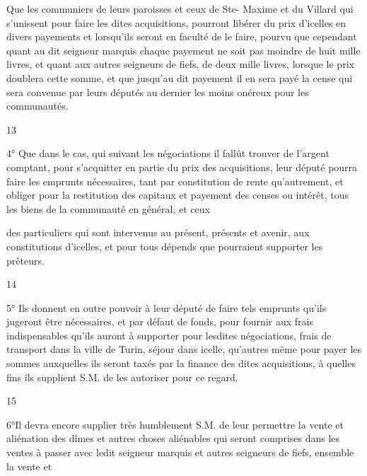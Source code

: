 \documentclass[a4paper,twoside,openany]{article}
\begin{document}

Que les communiers de leurs paroisses et ceux de Ste-
Maxime et du Villard qui s’unissent pour faire les
dites acquisitions, pourront libérer du prix d’icelles
en divers payements et lorsqu’ils seront en faculté de
le faire, pourvu que cependant quant au dit seigneur
marquis chaque payement ne soit pas moindre de
huit mille livres, et quant aux autres seigneurs de fiefs,
de deux mille livres, lorsque le prix doublera cette
somme, et que jusqu’au dit payement il en sera
payé la cense qui sera convenue par leurs députés au
dernier les moins onéreux pour les communautés.

\begin{center}
13
\end{center}
4° Que dans le cas, qui suivant les négociations il
fallût trouver de l’argent comptant, pour s’acquitter
en partie du prix des acquisitions, leur député pourra
faire les emprunts nécessaires, tant par constitution de
rente qu’autrement, et obliger pour la restitution
des capitaux et payement des censes ou intérêt,
tous les biens de la communauté en général, et ceux


des particuliers qui sont intervenus au présent, présents
et avenir, aux constitutions d’icelles, et pour tous
dépends que pourraient supporter les prêteurs.
\\
\begin{center}
14
\end{center}
5° Ils donnent en outre pouvoir à leur député de faire
tels emprunts qu’ils jugeront être nécessaires, et par
défaut de fonds, pour fournir aux frais indispensables
qu’ils auront à supporter pour lesdites négociations,
frais de transport dans la ville de Turin, séjour
dans icelle, qu’autres même pour payer les sommes
auxquelles ils seront taxés par la finance des dites
acquisitions, à quelles fins ils supplient S.M.
de les autoriser pour ce regard.
\\
\begin{center}
15
\end{center}
6°Il devra encore supplier très humblement S.M.
de leur permettre la vente et aliénation des dîmes
et autres choses aliénables qui seront comprises dans
les ventes à passer avec ledit seigneur marquis
et autres seigneurs de fiefs, ensemble la vente et 
\end{document}

